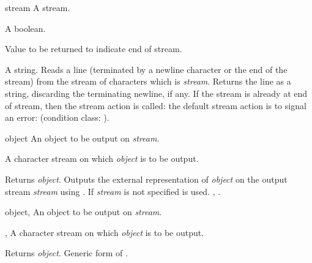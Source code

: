\begin{optDefinition}

\begin{arguments}
    \item[stream] A stream.
    \item[\optional{eos-error-p}] A boolean.
    \item[\optional{eos-value}] Value to be returned to indicate end of stream.
\end{arguments}
%
\result%
A string.
%
\remarks%
Reads a line (terminated by a newline character or the end of the
stream) from the stream of characters which is {\em stream}.  Returns
the line as a string, discarding the terminating newline, if any.  If
the stream is already at end of stream, then the stream action is
called: the default stream action is to signal an error: (condition
class: ).

\begin{arguments}
    \item[object] An object to be output on {\em stream}.
    \item[\optional{stream}] A character stream on which {\em object\/} is to
    be output.
\end{arguments}
%
\result%
Returns {\em object}.
%
\remarks%
Outputs the external representation of {\em object\/} on the output
stream {\em stream\/} using .  If {\em stream\/} is
not specified  is used.
%
\seealso%
, .

\begin{genericargs}
    \item[object, \classref{object}] An object to be output on {\em stream}.
    \item[\optional{stream}, \classref{stream}] A character stream on which {\em
        object\/} is to be output.
\end{genericargs}
%
\result%
Returns {\em object}.
%
\remarks%
Generic form of .


\end{optDefinition}
